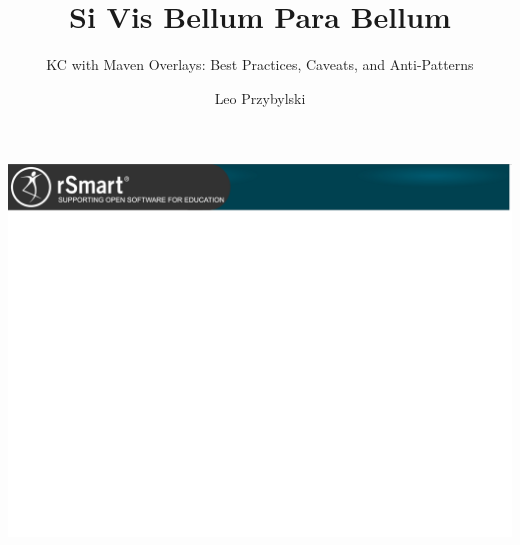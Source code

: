 \documentclass[xcolor=dvipsnames,14pt,professionalfonts]{beamer}
\begin{document}
\title{Si Vis Bellum Para Bellum}
\subtitle{KC with Maven Overlays: Best Practices, Caveats, and Anti-Patterns}
\author[Leo]{Leo Przybylski}

\usebackgroundtemplate%
{%
    \includegraphics[width=\paperwidth,height=\paperheight]{../img/header.png}%
}

{
%
\begin{frame}[plain]
  \titlepage
\end{frame}
}
\end{document}
